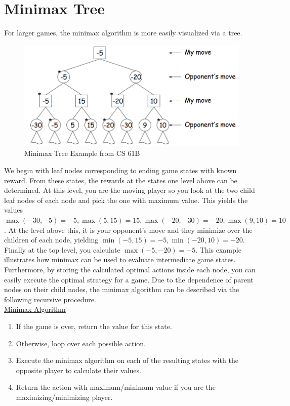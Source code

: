 \documentclass[12pt, letterpaper]{article}
\begin{document}
\section*{Minimax Tree}
For larger games, the minimax algorithm is more easily visualized via a tree.
\begin{figure}[H]
\centering
\includegraphics[scale=0.4]{minimax-tree.png}
\caption*{Minimax Tree Example from CS 61B}
\end{figure}
We begin with leaf nodes corresponding to ending game states with known reward. From these states, the rewards at the states one level above can be determined. At this level, you are the moving player so you look at the two child leaf nodes of each node and pick the one with maximum value. This yields the values $\max(-30, -5) = -5, \max(5, 15) = 15,\max(-20, -30) = -20,\max(9, 10) = 10$. At the level above this, it is your opponent's move and they minimize over the children of each node, yielding $\min(-5,15)=-5, \min(-20,10)=-20$. Finally at the top level, you calculate $\max(-5, -20) = -5$.
\newpage
This example illustrates how minimax can be used to evaluate intermediate game states. Furthermore, by storing the calculated optimal actions inside each node, you can easily execute the optimal strategy for a game. Due to the dependence of parent nodes on their child nodes, the minimax algorithm can be described via the following recursive procedure. \\[0.2cm]
\underline{Minimax Algorithm}
\begin{enumerate}
    \item If the game is over, return the value for this state.
    \item Otherwise, loop over each possible action.
    \item Execute the minimax algorithm on each of the resulting states with the opposite player to calculate their values.
    \item Return the action with maximum/minimum value if you are the maximizing/minimizing player.
\end{enumerate}
\end{document}
